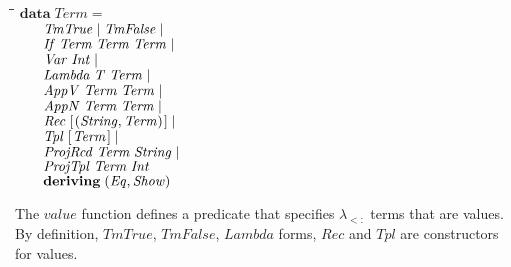 \documentclass[10pt]{article}
\newlength{\lwidth}\setlength{\lwidth}{4.5cm}
\newlength{\cwidth}\setlength{\cwidth}{8mm} %
\newcommand{\Conid}[1]{\mathit{#1}}
\newcommand{\Varid}[1]{\mathit{#1}}
\begin{document}
\begin{tabbing}
\qquad\=\hspace{\lwidth}\=\hspace{\cwidth}\=\+\kill
${\mathbf{data}\;\Conid{Term}\mathrel{=}}$\\
${\hskip2.00em\relax\Conid{TmTrue}\mid \Conid{TmFalse}\mid }$\\
${\hskip2.00em\relax\Conid{If}\;\Conid{Term}\;\Conid{Term}\;\Conid{Term}\mid }$\\
${\hskip2.00em\relax\Conid{Var}\;\Conid{Int}\mid }$\\
${\hskip2.00em\relax\Conid{Lambda}\;\Varid{T}\;\Conid{Term}\mid }$\\
${\hskip2.00em\relax\Conid{AppV}\;\Conid{Term}\;\Conid{Term}\mid }$\\
${\hskip2.00em\relax\Conid{AppN}\;\Conid{Term}\;\Conid{Term}\mid }$\\
${\hskip2.00em\relax\Conid{Rec}\;[\mskip1.5mu (\Conid{String},\Conid{Term})\mskip1.5mu]\mid }$\\
${\hskip2.00em\relax\Conid{Tpl}\;[\mskip1.5mu \Conid{Term}\mskip1.5mu]\mid }$\\
${\hskip2.00em\relax\Conid{ProjRcd}\;\Conid{Term}\;\Conid{String}\mid }$\\
${\hskip2.00em\relax\Conid{ProjTpl}\;\Conid{Term}\;\Conid{Int}}$\\
${\hskip2.00em\relax\mathbf{deriving}\;(\Conid{Eq},\Conid{Show})}$
\end{tabbing}
The \ensuremath{\Varid{value}} function defines a predicate that specifies $\lambda_{<:}$
terms that are values.  By definition, \ensuremath{\Conid{TmTrue}}, \ensuremath{\Conid{TmFalse}}, \ensuremath{\Conid{Lambda}}
forms, \ensuremath{\Conid{Rec}} and \ensuremath{\Conid{Tpl}} are constructors for values.
\end{document}
